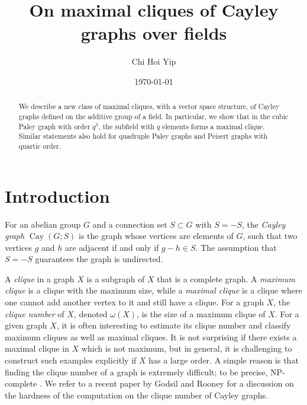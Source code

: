 \documentclass[12pt,oneside]{amsart}
\newcommand{\F}{\mathbb{F}}
\begin{document}
\title{On maximal cliques of Cayley graphs over fields}
\author{Chi Hoi Yip}
\address{Department of Mathematics \\ University of British Columbia \\ 1984 Mathematics Road \\ Canada V6T 1Z2}
\date{\today}

\begin{abstract}
We describe a new class of maximal cliques, with a vector space structure,  of Cayley graphs defined on the additive group of a field. In particular, we show that in the cubic Paley graph with order $q^3$, the subfield with $q$ elements forms a maximal clique. Similar statements also hold for quadruple Paley graphs and Peisert graphs with quartic order.
\end{abstract}
\maketitle

\section{Introduction}


For an abelian group $G$ and a connection set $S \subset G$ with $S=-S$, the {\em Cayley graph} $\operatorname{Cay}(G;S)$ is
the graph whose vertices are elements of $G$, such that two vertices $g$ and $h$ are adjacent if and only if $g-h \in S$. The assumption that $S=-S$ guarantees the graph is undirected.

A {\em clique} in a graph $X$ is a subgraph of $X$ that is a complete graph.  A {\em maximum clique} is a clique with the maximum size, while a {\em maximal clique} is a clique where one cannot add another vertex to it and still have a clique. For a graph $X$, the {\em clique number} of $X$, denoted $\omega (X)$, is the size of a maximum clique of $X$. For a given graph $X$, it is often interesting to estimate its clique number and classify maximum cliques as well as maximal cliques. It is not surprising if there exists a maximal clique in $X$ which is not maximum, but in general, it is challenging to construct such examples explicitly if $X$ has a large order. A simple reason is that finding the clique number of a graph is extremely difficult; to be precise, NP-complete \cite{RK}. We refer to a recent paper by Godsil and Rooney \cite{GR} for a discussion on the hardness of the computation on the clique number of Cayley graphs. 
\end{document}
